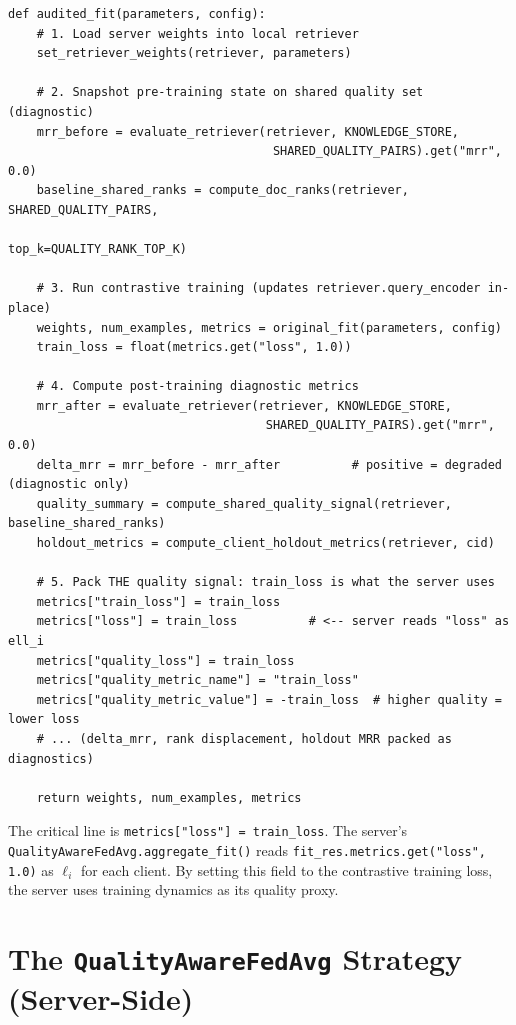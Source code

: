 \documentclass[12pt,a4paper]{article}
\begin{document}
\begin{lstlisting}[caption={Core logic of audited\_fit in client\_fn()}]
def audited_fit(parameters, config):
    # 1. Load server weights into local retriever
    set_retriever_weights(retriever, parameters)

    # 2. Snapshot pre-training state on shared quality set (diagnostic)
    mrr_before = evaluate_retriever(retriever, KNOWLEDGE_STORE,
                                     SHARED_QUALITY_PAIRS).get("mrr", 0.0)
    baseline_shared_ranks = compute_doc_ranks(retriever, SHARED_QUALITY_PAIRS,
                                              top_k=QUALITY_RANK_TOP_K)

    # 3. Run contrastive training (updates retriever.query_encoder in-place)
    weights, num_examples, metrics = original_fit(parameters, config)
    train_loss = float(metrics.get("loss", 1.0))

    # 4. Compute post-training diagnostic metrics
    mrr_after = evaluate_retriever(retriever, KNOWLEDGE_STORE,
                                    SHARED_QUALITY_PAIRS).get("mrr", 0.0)
    delta_mrr = mrr_before - mrr_after          # positive = degraded (diagnostic only)
    quality_summary = compute_shared_quality_signal(retriever, baseline_shared_ranks)
    holdout_metrics = compute_client_holdout_metrics(retriever, cid)

    # 5. Pack THE quality signal: train_loss is what the server uses
    metrics["train_loss"] = train_loss
    metrics["loss"] = train_loss          # <-- server reads "loss" as ell_i
    metrics["quality_loss"] = train_loss
    metrics["quality_metric_name"] = "train_loss"
    metrics["quality_metric_value"] = -train_loss  # higher quality = lower loss
    # ... (delta_mrr, rank displacement, holdout MRR packed as diagnostics)

    return weights, num_examples, metrics
\end{lstlisting}

The critical line is \texttt{metrics["loss"] = train\_loss}. The server's \texttt{QualityAwareFedAvg.aggregate\_fit()} reads \texttt{fit\_res.metrics.get("loss", 1.0)} as $\ell_i$ for each client. By setting this field to the contrastive training loss, the server uses training dynamics as its quality proxy.

\section{The \texttt{QualityAwareFedAvg} Strategy (Server-Side)}
\end{document}
